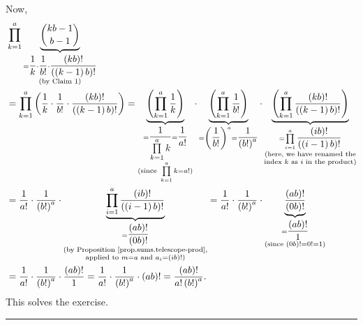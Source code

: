\documentclass[paper=a4, fontsize=12pt]{scrartcl}%
\let\prodnonlimits\prod
\renewcommand{\prod}{\prodnonlimits\limits}
\theoremstyle{plainsl}
\theoremstyle{definition}
\theoremstyle{remark}
\begin{document}
Now,
\begin{align*}
&  \prod_{k=1}^{a}\underbrace{\dbinom{kb-1}{b-1}}_{\substack{=\dfrac{1}%
{k}\cdot\dfrac{1}{b!}\cdot\dfrac{\left(  kb\right)  !}{\left(  \left(
k-1\right)  b\right)  !}\\\text{(by Claim 1)}}}\\
&  =\prod_{k=1}^{a}\left(  \dfrac{1}{k}\cdot\dfrac{1}{b!}\cdot\dfrac{\left(
kb\right)  !}{\left(  \left(  k-1\right)  b\right)  !}\right)
=\underbrace{\left(  \prod_{k=1}^{a}\dfrac{1}{k}\right)  }_{\substack{=\dfrac
{1}{\prod_{k=1}^{a}k}=\dfrac{1}{a!}\\\text{(since }\prod_{k=1}^{a}%
k=a!\text{)}}}\cdot\underbrace{\left(  \prod_{k=1}^{a}\dfrac{1}{b!}\right)
}_{=\left(  \dfrac{1}{b!}\right)  ^{a}=\dfrac{1}{\left(  b!\right)  ^{a}}%
}\cdot\underbrace{\left(  \prod_{k=1}^{a}\dfrac{\left(  kb\right)  !}{\left(
\left(  k-1\right)  b\right)  !}\right)  }_{\substack{=\prod_{i=1}^{a}%
\dfrac{\left(  ib\right)  !}{\left(  \left(  i-1\right)  b\right)
!}\\\text{(here, we have renamed the}\\\text{index }k\text{ as }i\text{ in the
product)}}}\\
&  =\dfrac{1}{a!}\cdot\dfrac{1}{\left(  b!\right)  ^{a}}\cdot\underbrace{\prod
_{i=1}^{a}\dfrac{\left(  ib\right)  !}{\left(  \left(  i-1\right)  b\right)
!}}_{\substack{=\dfrac{\left(  ab\right)  !}{\left(  0b\right)  !}\\\text{(by
Proposition \ref{prop.sums.telescope-prod},}\\\text{applied to }m=a\text{ and
}a_{i}=\left(  ib\right)  !\text{)}}}=\dfrac{1}{a!}\cdot\dfrac{1}{\left(
b!\right)  ^{a}}\cdot\underbrace{\dfrac{\left(  ab\right)  !}{\left(
0b\right)  !}}_{\substack{=\dfrac{\left(  ab\right)  !}{1}\\\text{(since
}\left(  0b\right)  !=0!=1\text{)}}}\\
&  =\dfrac{1}{a!}\cdot\dfrac{1}{\left(  b!\right)  ^{a}}\cdot\dfrac{\left(
ab\right)  !}{1}=\dfrac{1}{a!}\cdot\dfrac{1}{\left(  b!\right)  ^{a}}%
\cdot\left(  ab\right)  !=\dfrac{\left(  ab\right)  !}{a!\left(  b!\right)
^{a}}.
\end{align*}
This solves the exercise.

\rule{\linewidth}{0.3pt} \\[0.4cm]
\end{document}
